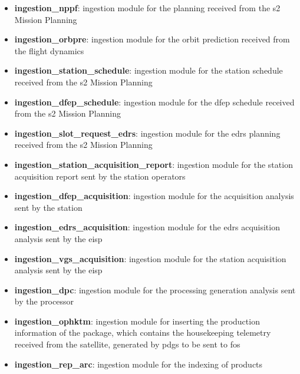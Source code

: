 \begin{itemize} 

\item \textbf{ingestion\_nppf}: ingestion module for the planning received from the \acrshort{s2} Mission Planning

\item \textbf{ingestion\_orbpre}: ingestion module for the orbit prediction received from the flight dynamics

\item \textbf{ingestion\_station\_schedule}: ingestion module for the station schedule received from the \acrshort{s2} Mission Planning

\item \textbf{ingestion\_dfep\_schedule}: ingestion module for the \acrshort{dfep} schedule received from the \acrshort{s2} Mission Planning

\item \textbf{ingestion\_slot\_request\_edrs}: ingestion module for the \acrshort{edrs} planning received from the \acrshort{s2} Mission Planning

\item \textbf{ingestion\_station\_acquisition\_report}: ingestion module for the station acquisition report sent by the station operators

\item \textbf{ingestion\_dfep\_acquisition}: ingestion module for the acquisition analysis sent by the station

\item \textbf{ingestion\_edrs\_acquisition}: ingestion module for the \acrshort{edrs} acquisition analysis sent by the \acrshort{eisp}

\item \textbf{ingestion\_vgs\_acquisition}: ingestion module for the station acquisition analysis sent by the \acrshort{eisp}

\item \textbf{ingestion\_dpc}: ingestion module for the processing generation analysis sent by the processor

\item \textbf{ingestion\_ophktm}: ingestion module for inserting the production information of the package, which contains the housekeeping telemetry received from the satellite, generated by \acrshort{pdgs} to be sent to \acrshort{fos}

\item \textbf{ingestion\_rep\_arc}: ingestion module for the indexing of products


\end{itemize}
